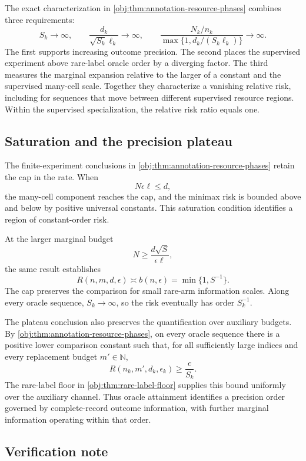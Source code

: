 \documentclass[11pt]{article}
\begin{document}
The exact characterization in \cref{obj:thm:annotation-resource-phases} combines three requirements:
\[
S_k\longrightarrow\infty,
\qquad
\frac{d_k}{\sqrt{S_k}\ell_k}\longrightarrow\infty,
\qquad
\frac{N_k/n_k}
{\max\{1,d_k/(S_k\ell_k)\}}
\longrightarrow\infty.
\]
The first supports increasing outcome precision. The second places the supervised experiment above rare-label oracle order by a diverging factor. The third measures the marginal expansion relative to the larger of a constant and the supervised many-cell scale. Together they characterize a vanishing relative risk, including for sequences that move between different supervised resource regions. Within the supervised specialization, the relative risk ratio equals one.

\subsection{Saturation and the precision plateau}

The finite-experiment conclusions in \cref{obj:thm:annotation-resource-phases} retain the cap in the rate. When
\[
N\epsilon\ell\le d,
\]
the many-cell component reaches the cap, and the minimax risk is bounded above and below by positive universal constants. This saturation condition identifies a region of constant-order risk.

At the larger marginal budget
\[
N\ge \frac{d\sqrt{S}}{\epsilon\ell},
\]
the same result establishes
\[
R(n,m,d,\epsilon)\asymp b(n,\epsilon)
=\min\{1,S^{-1}\}.
\]
The cap preserves the comparison for small rare-arm information scales. Along every oracle sequence, \(S_k\to\infty\), so the risk eventually has order \(S_k^{-1}\).

The plateau conclusion also preserves the quantification over auxiliary budgets. By \cref{obj:thm:annotation-resource-phases}, on every oracle sequence there is a positive lower comparison constant such that, for all sufficiently large indices and every replacement budget \(m'\in\mathbb N\),
\[
R(n_k,m',d_k,\epsilon_k)\ge \frac{c}{S_k}.
\]
The rare-label floor in \cref{obj:thm:rare-label-floor} supplies this bound uniformly over the auxiliary channel. Thus oracle attainment identifies a precision order governed by complete-record outcome information, with further marginal information operating within that order.

\subsection{Verification note}
\end{document}
